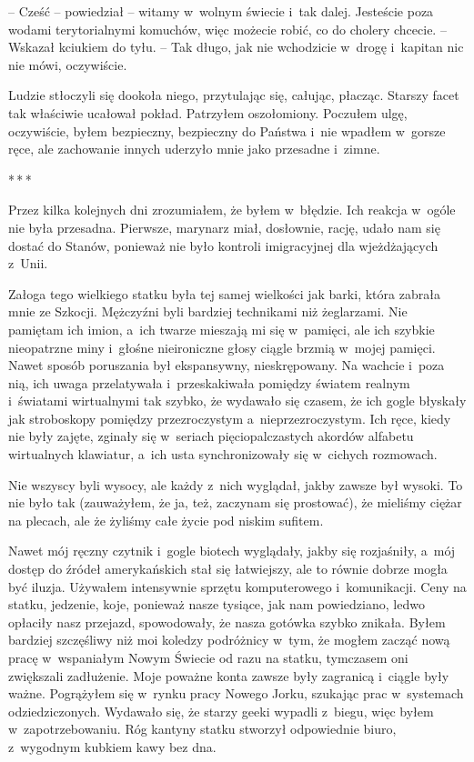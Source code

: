 \documentclass[oneside,polish,12pt,sfheadings]{mwbk}
\newcommand{\threeast}{\bigskip\par\centerline{*\,*\,*}\medskip\par}%
\begin{document}
-- Cześć -- powiedział -- witamy w~wolnym świecie i~tak dalej. Jesteście
poza wodami terytorialnymi komuchów, więc możecie robić, co do cholery
chcecie. -- Wskazał kciukiem do tyłu. -- Tak długo, jak nie wchodzicie w~drogę i~kapitan nic nie mówi, oczywiście.

Ludzie stłoczyli się dookoła niego, przytulając się, całując, płacząc.
Starszy facet tak właściwie ucałował pokład. Patrzyłem oszołomiony.
Poczułem ulgę, oczywiście, byłem bezpieczny, bezpieczny do Państwa i~nie
wpadłem w~gorsze ręce, ale zachowanie innych uderzyło mnie jako
przesadne i~zimne.

\threeast

Przez kilka kolejnych dni zrozumiałem, że byłem w~błędzie. Ich reakcja w~ogóle nie była przesadna. Pierwsze, marynarz miał, dosłownie, rację,
udało nam się dostać do Stanów, ponieważ nie było kontroli imigracyjnej
dla wjeżdżających z~Unii.

Załoga tego wielkiego statku była tej samej wielkości jak barki, która
zabrała mnie ze Szkocji. Mężczyźni byli bardziej technikami niż
żeglarzami. Nie pamiętam ich imion, a~ich twarze mieszają mi się w~pamięci, ale ich szybkie nieopatrzne miny i~głośne nieironiczne głosy
ciągle brzmią w~mojej pamięci. Nawet sposób poruszania był ekspansywny,
nieskrępowany. Na wachcie i~poza nią, ich uwaga przelatywała i~przeskakiwała pomiędzy światem realnym i~światami wirtualnymi tak
szybko, że wydawało się czasem, że ich gogle błyskały jak stroboskopy
pomiędzy przezroczystym a~nieprzezroczystym. Ich ręce, kiedy nie były
zajęte, zginały się w~seriach pięciopalczastych akordów alfabetu
wirtualnych klawiatur, a~ich usta synchronizowały się w~cichych
rozmowach.

Nie wszyscy byli wysocy, ale każdy z~nich wyglądał, jakby zawsze był
wysoki. To nie było tak (zauważyłem, że ja, też, zaczynam się
prostować), że mieliśmy ciężar na plecach, ale że żyliśmy całe życie pod
niskim sufitem.

Nawet mój ręczny czytnik i~gogle biotech wyglądały, jakby się
rozjaśniły, a~mój dostęp do źródeł amerykańskich stał się łatwiejszy,
ale to równie dobrze mogła być iluzja. Używałem intensywnie sprzętu
komputerowego i~komunikacji. Ceny na statku, jedzenie, koje, ponieważ
nasze tysiące, jak nam powiedziano, ledwo opłaciły nasz przejazd,
spowodowały, że nasza gotówka szybko znikała. Byłem bardziej szczęśliwy
niż moi koledzy podróżnicy w~tym, że mogłem zacząć nową pracę w~wspaniałym Nowym Świecie od razu na statku, tymczasem oni zwiększali
zadłużenie. Moje poważne konta zawsze były zagranicą i~ciągle były
ważne. Pogrążyłem się w~rynku pracy Nowego Jorku, szukając prac w~systemach odziedziczonych. Wydawało się, że starzy geeki wypadli z~biegu, więc byłem w~zapotrzebowaniu. Róg kantyny statku stworzył
odpowiednie biuro, z~wygodnym kubkiem kawy bez dna.
\end{document}
